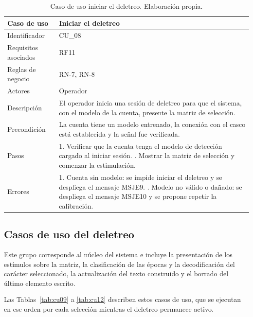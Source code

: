 \begin{table}[H]
\centering
\small
\begin{tabularx}{\textwidth}{|L{3.0cm}|Y|}
\hline
\textbf{Caso de uso} & \textbf{Iniciar el deletreo} \\
\hline
Identificador & CU\_08 \\
\hline
Requisitos asociados & RF11 \\
\hline
Reglas de negocio & RN-7, RN-8 \\
\hline
Actores & Operador \\
\hline
Descripción & El operador inicia una sesión de deletreo para que el sistema, con el modelo de la cuenta, presente la matriz de selección. \\
\hline
Precondición & La cuenta tiene un modelo entrenado, la conexión con el casco está establecida y la señal fue verificada. \\
\hline
Pasos & 1. Verificar que la cuenta tenga el modelo de detección cargado al iniciar sesión. . Mostrar la matriz de selección y comenzar la estimulación. \\
\hline
Errores & 1. Cuenta sin modelo: se impide iniciar el deletreo y se despliega el mensaje MSJE9. . Modelo no válido o dañado: se despliega el mensaje MSJE10 y se propone repetir la calibración. \\
\hline
\end{tabularx}
\caption{Caso de uso iniciar el deletreo. Elaboración propia.}
\label{tab:cu08}
\end{table}


\subsection{Casos de uso del deletreo}

Este grupo corresponde al núcleo del sistema e incluye la presentación de los estímulos sobre la
matriz, la clasificación de las épocas y la decodificación del carácter seleccionado, la
actualización del texto construido y el borrado del último elemento escrito.

Las Tablas~\ref{tab:cu09} a \ref{tab:cu12} describen estos casos de uso, que se ejecutan en ese orden por cada selección mientras el deletreo permanece activo.

